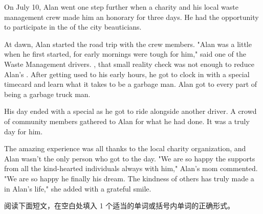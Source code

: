 \documentclass{英语试卷}
\begin{document}
\par On July 10, Alan went one step further when a charity and his local waste management crew made him an honorary  for three days. He had the opportunity to participate in the  of the city beauticians.\par
\par At dawn, Alan started the road trip with the crew members. "Alan was a little  when he first started, for early mornings were tough for him," said one of the Waste Management drivers. , that small reality check was not enough to reduce Alan's . After getting used to his early hours, he got to clock in with a special timecard and  learn what it takes to be a garbage man. Alan got to  every part of being a garbage truck man.\par
\par His day ended with a special  as he got to ride alongside another driver. A crowd of community members gathered to  Alan for what he had done. It was a truly  day for him.\par
\par The amazing experience was all thanks to the local charity organization, and Alan wasn't the only person who got to  the day. "We are so happy the supports from all the kind-hearted individuals always  with him," Alan's mom commented. "We are so happy he finally  his dream. The kindness of others has truly made a  in Alan's life," she added with a grateful smile.\par
{}
\par 阅读下面短文，在空白处填入 1 个适当的单词或括号内单词的正确形式。\par
\end{document}
